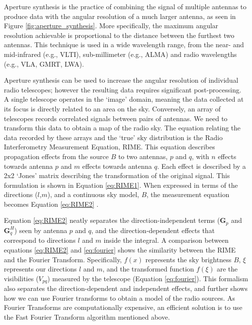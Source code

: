 Aperture synthesis is the practice of combining the signal of multiple antennas to produce data with the angular resolution of a much larger antenna, as seen in Figure \ref{fig:aperture_synthesis}. More specifically, the maximum angular resolution achievable is proportional to the distance between the furthest two antennas. This technique is used in a wide wavelength range, from the near- and mid-infrared (e.g., VLTI), sub-millimeter (e.g., ALMA) and radio wavelengths (e.g., VLA, GMRT, LWA). 

Aperture synthesis can be used to increase the angular resolution of individual radio telescopes; however the resulting data requires significant post-processing. A single telescope operates in the `image' domain, meaning the data collected at its focus is directly related to an area on the sky. Conversely, an array of telescopes records correlated signals between pairs of antennas. We need to transform this data to obtain a map of the radio sky. The equation relating the data recorded by these arrays and the `true' sky distribution is the Radio Interferometry Measurement Equation, RIME. This equation describes propagation effects from the source $B$ to two antennas, $p$ and $q$, with $n$ effects towards antenna $p$ and $m$ effects towards antenna $q$. Each effect is described by a 2x2 `Jones' matrix describing the transformation of the original signal. This formulation is shown in Equation \ref{eq:RIME1}. When expressed in terms of the directions ($l$,$m$), and a continuous sky model, $B$, the measurement equation becomes Equation \ref{eq:RIME2}\citep{thompson1986interferometry} .

Equation \ref{eq:RIME2} neatly separates the direction-independent terms ($\bm{G}_p$ and $\bm{G}^H_q$) seen by antenna $p$ and $q$, and the direction-dependent effects that correspond to directions $l$ and $m$ inside the integral. A comparison between equations \ref{eq:RIME2} and \ref{eq:fourier} shows the similarity between the RIME and the Fourier Transform. Specifically, $f(x)$ represents the sky brightness $B$, $\xi$ represents our directions $l$ and $m$, and the transformed function $f(\xi)$ are the \gls{visibilities} ($V_{pq}$) measured by the telescope (Equation \ref{eq:fourier}). This formalism also separates the direction-dependent and independent effects, and further shows how we can use Fourier transforms to obtain a model of the radio sources. As Fourier Transforms are computationally expensive, an efficient solution is to use the Fast Fourier Transform algorithm mentioned above. 

